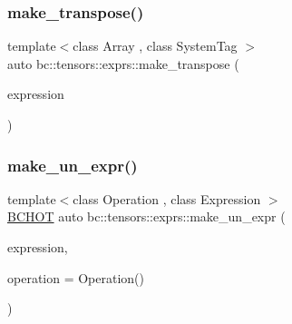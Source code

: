 \mbox{\label{namespacebc_1_1tensors_1_1exprs_af7cf5f21ea51f436ae32955208884505}} 
\subsubsection{\texorpdfstring{make\+\_\+transpose()}{make\_transpose()}\hspace{0.1cm}{\footnotesize\ttfamily [2/2]}}
{\footnotesize\ttfamily template$<$class Array , class System\+Tag $>$ \\
auto bc\+::tensors\+::exprs\+::make\+\_\+transpose (\begin{DoxyParamCaption}\item[{\hyperlink{structbc_1_1tensors_1_1exprs_1_1Un__Op}{Un\+\_\+\+Op}$<$ \hyperlink{structbc_1_1oper_1_1transpose}{oper\+::transpose}$<$ System\+Tag $>$, \hyperlink{structbc_1_1tensors_1_1exprs_1_1Array}{Array} $>$}]{expression }\end{DoxyParamCaption})}

\mbox{\label{namespacebc_1_1tensors_1_1exprs_afcded75875b3598bafaffb7ad18d3173}} 
\subsubsection{\texorpdfstring{make\+\_\+un\+\_\+expr()}{make\_un\_expr()}}
{\footnotesize\ttfamily template$<$class Operation , class Expression $>$ \\
\hyperlink{common_8h_ac085f07cc309e3aac24aa3fc0a40f6d2}{B\+C\+H\+OT} auto bc\+::tensors\+::exprs\+::make\+\_\+un\+\_\+expr (\begin{DoxyParamCaption}\item[{Expression}]{expression,  }\item[{Operation}]{operation = {\ttfamily Operation()} }\end{DoxyParamCaption})}

\mbox{\label{namespacebc_1_1tensors_1_1exprs_a1c3a1ebea52ac80a7f1fbe90856d3132}} 
